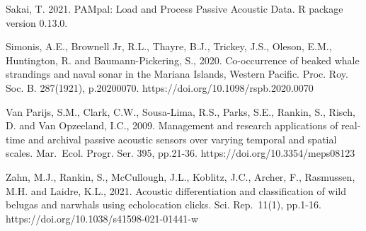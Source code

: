 \documentclass[
  authoryear,
  preprint,
  3p]{elsarticle}
\begin{document}
Sakai, T. 2021. PAMpal: Load and Process Passive Acoustic Data. R
package version 0.13.0.

Simonis, A.E., Brownell Jr, R.L., Thayre, B.J., Trickey, J.S., Oleson,
E.M., Huntington, R. and Baumann-Pickering, S., 2020. Co-occurrence of
beaked whale strandings and naval sonar in the Mariana Islands, Western
Pacific. Proc. Roy. Soc. B. 287(1921), p.20200070.
https://doi.org/10.1098/rspb.2020.0070

Van Parijs, S.M., Clark, C.W., Sousa-Lima, R.S., Parks, S.E., Rankin,
S., Risch, D. and Van Opzeeland, I.C., 2009. Management and research
applications of real-time and archival passive acoustic sensors over
varying temporal and spatial scales. Mar.~Ecol. Progr. Ser. 395,
pp.21-36. https://doi.org/10.3354/meps08123

Zahn, M.J., Rankin, S., McCullough, J.L., Koblitz, J.C., Archer, F.,
Rasmussen, M.H. and Laidre, K.L., 2021. Acoustic differentiation and
classification of wild belugas and narwhals using echolocation clicks.
Sci. Rep.~11(1), pp.1-16. https://doi.org/10.1038/s41598-021-01441-w


  
\end{document}

